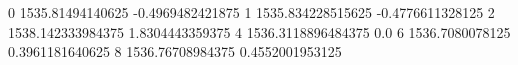 0 1535.81494140625 -0.4969482421875
1 1535.834228515625 -0.4776611328125
2 1538.142333984375 1.8304443359375
4 1536.3118896484375 0.0
6 1536.7080078125 0.3961181640625
8 1536.76708984375 0.4552001953125
